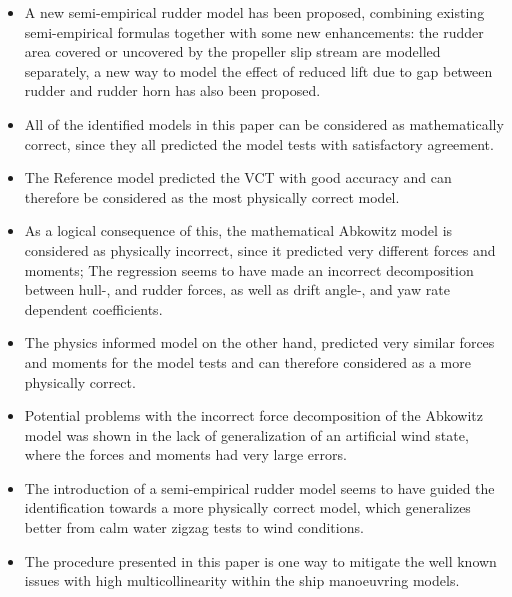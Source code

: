 \begin{itemize}
    \item A new semi-empirical rudder model has been proposed, combining existing semi-empirical formulas together with some new enhancements: the rudder area covered or uncovered by the propeller slip stream are modelled separately, a new way to model the effect of reduced lift due to gap between rudder and rudder horn has also been proposed.     

    \item All of the identified models in this paper can be considered as mathematically correct, since they all predicted the model tests with satisfactory agreement.
    
    \item The Reference model predicted the VCT with good accuracy and can therefore be considered as the most physically correct model.   
    \item As a logical consequence of this, the mathematical Abkowitz model is considered as physically incorrect, since it predicted very different forces and moments; The regression seems to have made an incorrect decomposition between hull-, and rudder forces, as well as drift angle-, and yaw rate dependent coefficients.  
    \item The physics informed model on the other hand, predicted very similar forces and moments for the model tests and can therefore considered as a more physically correct.
    \item Potential problems with the incorrect force decomposition of the Abkowitz model was shown in the lack of generalization of an artificial wind state, where the forces and moments had very large errors. 
    \item The introduction of a semi-empirical rudder model seems to have guided the identification towards a more physically correct model, which generalizes better from calm water zigzag tests to wind conditions. 
    
    \item The procedure presented in this paper is one way to mitigate the well known issues with high multicollinearity within the ship manoeuvring models.
\end{itemize}